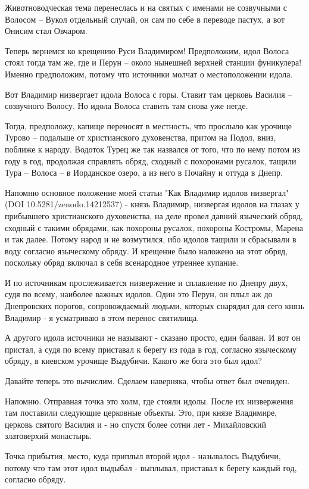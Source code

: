 \documentclass[a5paper,11pt,openany]{article}
\begin{document}
 Животноводческая тема перенеслась и на святых с именами не созвучными с Волосом – Вукол отдельный случай, он сам по себе в переводе пастух, а вот Онисим стал Овчаром.

  Теперь вернемся ко крещению Руси Владимиром! Предположим, идол Волоса стоял тогда там же, где и Перун – около нынешней верхней станции фуникулера! Именно предположим, потому что источники молчат о местоположении идола.

  Вот Владимир низвергает идола Волоса с горы. Ставит там церковь Василия – созвучного Волосу. Но идола Волоса ставить там снова уже негде.

   Тогда, предположу, капище переносят в местность, что прослыло как урочище Турово – подальше от христианского духовенства, притом на Подол, вниз, поближе к народу. Водоток Турец же так назвался от того, что по нему потом из году в год, продолжая справлять обряд, сходный с похоронами русалок, тащили Тура – Волоса – в Иорданское озеро, а из него в Почайну и оттуда в Днепр.

    Напомню основное положение моей статьи "Как Владимир идолов низвергал" (DOI 10.5281/zenodo.14212537) - князь Владимир, низвергая идолов на глазах у прибывшего христианского духовенства, на деле провел давний языческий обряд, сходный с такими обрядами, как похороны русалок, похороны Костромы, Марена и так далее. Потому народ и не возмутился, ибо идолов тащили и сбрасывали в воду согласно языческому обряду. И крещение было наложено на этот обряд, поскольку обряд включал в себя всенародное утреннее купание.

   И по источникам прослеживается низвержение и сплавление по Днепру двух, судя по всему, наиболее важных идолов. Один это Перун, он плыл аж до Днепровских порогов,  сопровождаемый людьми, которых снарядил для сего князь Владимир - я усматриваю в этом перенос святилища. 

А другого идола источники не называют - сказано просто, един балван. И вот он пристал, а судя по всему приставал к берегу из года в год, согласно языческому обряду, в киевском урочище Выдубичи. Какого же бога это был идол?

   Давайте теперь это вычислим. Сделаем наверняка, чтобы ответ был очевиден.

   Напомню. Отправная точка это холм, где стояли идолы. После их низвержения там поставили следующие церковные объекты. Это, при князе Владимире, церковь святого Василия и - но спустя более сотни лет - Михайловский златоверхий монастырь.

    Точка прибытия, место, куда приплыл второй идол - называлось Выдубичи, потому что там этот идол выдыбал - выплывал, приставал к берегу каждый год, согласно обряду. 
\end{document}
